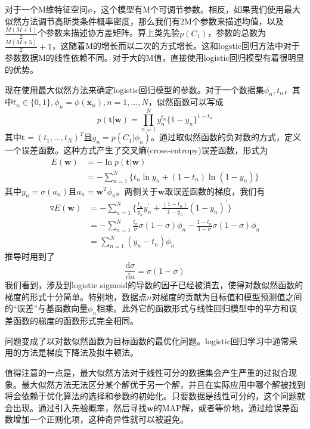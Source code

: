 对于一个M维特征空间$\phi$，这个模型有M个可调节参数。相反，如果我们使用最大似然方法调节高斯类条件概率密度，那么我们有2M个参数来描述均值，以及$\frac{M(M+1)}{2}$个参数来描述协方差矩阵。算上类先验$p(C_1)$，参数的总数为$\frac{M(M+5)}{2}+1$，这随着M的增长而以二次的方式增长。这和logstic回归方法中对于参数数据M的线性依赖不同。对于大的M值，直接使用logistic回归模型有着很明显的优势。

现在使用最大似然方法来确定logistic回归模型的参数。对于一个数据集$\phi_n,t_n$，其中$t_n\in \{0,1\},\phi_n=\phi(\boldsymbol{x}_n),n=1,\dots,N$，似然函数可以写成
\begin{equation}
	p(\boldsymbol{t}|\boldsymbol{w})=\prod_{n=1}^{N}y_n^{t_n}\{1-y_n \}^{1-t_n}
\end{equation}
其中$\boldsymbol{t}=(t_1,\dots,t_N)^T$且$y_n=p(C_1|\phi_n)$。通过取似然函数的负对数的方式，定义一个误差函数。这种方式产生了交叉熵(cross-entropy)误差函数，形式为
\begin{equation}
	\begin{aligned}
	E(\boldsymbol{w})&=-\ln p(\boldsymbol{t}|\boldsymbol{w})\\
	&=-\sum_{n=1}^{N}\{t_n\ln y_n+(1-t_n)\ln (1-y_n) \}
	\end{aligned}
\end{equation}
其中$y_n=\sigma(a_n)$且$a_n=\boldsymbol{w}^T\phi_n$。两侧关于$\boldsymbol{w}$取误差函数的梯度，我们有
\begin{equation}
\begin{aligned}
	\triangledown E(\boldsymbol{w})&=-\sum_{n=1}^{N}\{\frac{t_n}{y_n}y_n^{'}+\frac{(1-t_n)}{1-y_n}(1-y_n)^{'} \}\\
	&=-\sum_{n=1}^{N}\frac{t_n}{\sigma}\sigma(1-\sigma)\phi_n - \frac{1-t_n}{1-\sigma}\sigma(1-\sigma)\phi_n\\
	&=\sum_{n=1}^{N}(y_n-t_n)\phi_n
\end{aligned}
\end{equation}
推导时用到了
\begin{equation}
	\frac{\mathrm{d}\sigma}{\mathrm{d}a}=\sigma(1-\sigma)
\end{equation}
我们看到，涉及到logistic sigmoid的导数的因子已经被消去，使得对数似然函数的梯度的形式十分简单。特别地，数据点$n$对梯度的贡献为目标值和模型预测值之间的“误差”与基函数向量$\phi_n$相乘。此外它的函数形式与线性回归模型中的平方和误差函数的梯度的函数形式完全相同。

问题变成了以对数似然函数为目标函数的最优化问题。logistic回归学习中通常采用的方法是梯度下降法及拟牛顿法。

值得注意的一点是，最大似然方法对于线性可分的数据集会产生严重的过拟合现象。最大似然方法无法区分某个解优于另一个解，并且在实际应用中哪个解被找到将会依赖于优化算法的选择和参数的初始化。只要数据是线性可分的，这个问题就会出现。通过引入先验概率，然后寻找$\boldsymbol{w}$的MAP解，或者等价地，通过给误差函数增加一个正则化项，这种奇异性就可以被避免。
